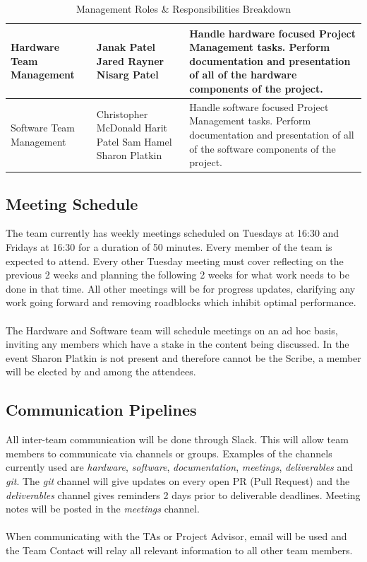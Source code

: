 \documentclass[11pt]{article}
\begin{document}
\begin{table}[H]
\begin{tabularx}{\textwidth}{| l | p{4cm} | X |}
Hardware Team Management & Janak Patel \newline Jared Rayner \newline Nisarg Patel & Handle hardware focused Project Management tasks. \newline Perform documentation and presentation of all of the hardware components of the project. \\ \hline
Software Team Management & Christopher McDonald \newline Harit Patel \newline Sam Hamel \newline Sharon Platkin & Handle software focused Project Management tasks. \newline Perform documentation and presentation of all of the software components of the project.\\ \hline
\end{tabularx}
\caption{Management Roles \& Responsibilities Breakdown} 
\label{mgmtrr}
\end{table}
\subsection{Meeting Schedule}
The team currently has weekly meetings scheduled on Tuesdays at 16:30 and Fridays at 16:30 for a duration of 50 minutes. Every member of the team is expected to attend. Every other Tuesday meeting must cover reflecting on the previous 2 weeks and planning the following 2 weeks for what work needs to be done in that time. All other meetings will be for progress updates, clarifying any work going forward and removing roadblocks which inhibit optimal performance. \\ \\
The Hardware and Software team will schedule meetings on an ad hoc basis, inviting any members which have a stake in the content being discussed. In the event Sharon Platkin is not present and therefore cannot be the Scribe, a member will be elected by and among the attendees.
\subsection{Communication Pipelines}
All inter-team communication will be done through Slack. This will allow team members to communicate via channels or groups. Examples of the channels currently used are \textit{hardware}, \textit{software}, \textit{documentation}, \textit{meetings}, \textit{deliverables} and \textit{git}. The \textit{git} channel will give updates on every open PR (Pull Request) and the \textit{deliverables} channel gives reminders 2 days prior to deliverable deadlines. Meeting notes will be posted in the \textit{meetings} channel. \\ \\
When communicating with the TAs or Project Advisor, email will be used and the Team Contact will relay all relevant information to all other team members.
\end{document}
